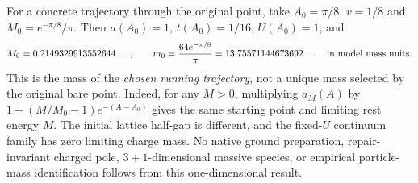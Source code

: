 For a concrete trajectory through the original point, take
$A_0=\pi/8$, $v=1/8$ and $M_0=e^{-\pi/8}/\pi$.
Then $a(A_0)=1$, $t(A_0)=1/16$, $U(A_0)=1$, and
\[
 M_0=0.2149329913552644\ldots,\qquad
 m_0=\frac{64e^{-\pi/8}}\pi=13.75571144673692\ldots
 \quad\hbox{in model mass units}.
\]
This is the mass of the \emph{chosen running trajectory}, not a unique
mass selected by the original bare point.  Indeed, for any $M>0$,
multiplying $a_M(A)$ by
$1+(M/M_0-1)e^{-(A-A_0)}$ gives the same starting point and limiting
rest energy $M$.  The initial lattice half-gap is different, and the
fixed-$U$ continuum family has zero limiting charge mass.  No native
ground preparation, repair-invariant charged pole, $3+1$-dimensional
massive species, or empirical particle-mass identification follows from
this one-dimensional result.
